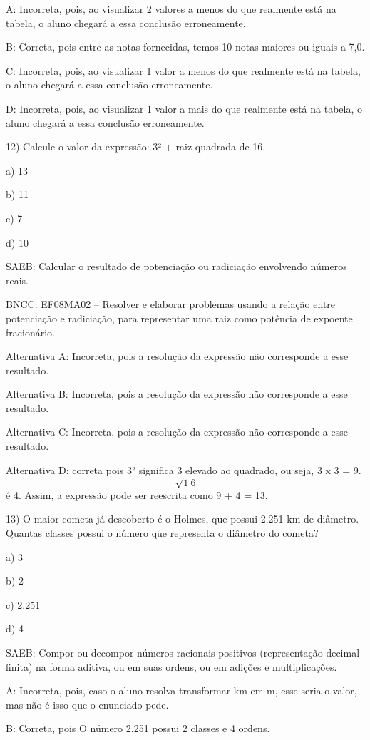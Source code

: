 A: Incorreta, pois, ao visualizar 2 valores a menos do que realmente
está na tabela, o aluno chegará a essa conclusão erroneamente.

B: Correta, pois entre as notas fornecidas, temos 10 notas maiores ou
iguais a 7,0.

C: Incorreta, pois, ao visualizar 1 valor a menos do que realmente está
na tabela, o aluno chegará a essa conclusão erroneamente.

D: Incorreta, pois, ao visualizar 1 valor a mais do que realmente está
na tabela, o aluno chegará a essa conclusão erroneamente.

12) Calcule o valor da expressão: 3² + raiz quadrada de 16.

a) 13

b) 11

c) 7

d) 10

SAEB: Calcular o resultado de potenciação ou radiciação envolvendo
números reais.

BNCC: EF08MA02 -- Resolver e elaborar problemas usando a relação entre
potenciação e radiciação, para representar uma raiz como potência de
expoente fracionário.

Alternativa A: Incorreta, pois a resolução da expressão não corresponde
a esse resultado.

Alternativa B: Incorreta, pois a resolução da expressão não corresponde
a esse resultado.

Alternativa C: Incorreta, pois a resolução da expressão não corresponde
a esse resultado.

Alternativa D: correta pois 3² significa 3 elevado ao quadrado, ou seja,
3 x 3 = 9. \[ \sqrt 16\] é 4. Assim, a expressão pode ser reescrita como
9 + 4 = 13.

13) O maior cometa já descoberto é o Holmes, que possui 2.251 km de
diâmetro. Quantas classes possui o número que representa o diâmetro do
cometa?

a) 3

b) 2

c) 2.251

d) 4

SAEB: Compor ou decompor números racionais positivos (representação
decimal finita) na forma aditiva, ou em suas ordens, ou em adições e
multiplicações.

A: Incorreta, pois, caso o aluno resolva transformar km em m, esse seria
o valor, mas não é isso que o enunciado pede.

B: Correta, pois O número 2.251 possui 2 classes e 4 ordens.

